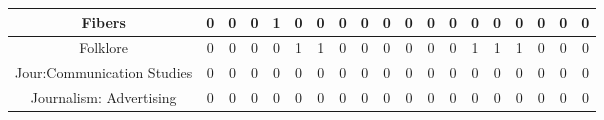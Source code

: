 \documentclass[10pt]{article}
\begin{document}
\begin{landscape}
\begin{longtable}[c]{|ccccccccccccccccccc|}
	\multicolumn{1}{|c|}{Fibers}                                     & \multicolumn{1}{c|}{0}          & \multicolumn{1}{c|}{0}          & \multicolumn{1}{c|}{0}          & \multicolumn{1}{c|}{1}          & \multicolumn{1}{c|}{0}          & \multicolumn{1}{c|}{0}          & \multicolumn{1}{c|}{0}          & \multicolumn{1}{c|}{0}          & \multicolumn{1}{c|}{0}          & \multicolumn{1}{c|}{0}          & \multicolumn{1}{c|}{0}          & \multicolumn{1}{c|}{0}          & \multicolumn{1}{c|}{0}          & \multicolumn{1}{c|}{0}          & \multicolumn{1}{c|}{0}          & \multicolumn{1}{c|}{0}          & \multicolumn{1}{c|}{0}          & 0          \\ \hline
	\multicolumn{1}{|c|}{Folklore}                                   & \multicolumn{1}{c|}{0}          & \multicolumn{1}{c|}{0}          & \multicolumn{1}{c|}{0}          & \multicolumn{1}{c|}{0}          & \multicolumn{1}{c|}{1}          & \multicolumn{1}{c|}{1}          & \multicolumn{1}{c|}{0}          & \multicolumn{1}{c|}{0}          & \multicolumn{1}{c|}{0}          & \multicolumn{1}{c|}{0}          & \multicolumn{1}{c|}{0}          & \multicolumn{1}{c|}{0}          & \multicolumn{1}{c|}{1}          & \multicolumn{1}{c|}{1}          & \multicolumn{1}{c|}{1}          & \multicolumn{1}{c|}{0}          & \multicolumn{1}{c|}{0}          & 0          \\ \hline
	\multicolumn{1}{|c|}{Jour:Communication Studies}                 & \multicolumn{1}{c|}{0}          & \multicolumn{1}{c|}{0}          & \multicolumn{1}{c|}{0}          & \multicolumn{1}{c|}{0}          & \multicolumn{1}{c|}{0}          & \multicolumn{1}{c|}{0}          & \multicolumn{1}{c|}{0}          & \multicolumn{1}{c|}{0}          & \multicolumn{1}{c|}{0}          & \multicolumn{1}{c|}{0}          & \multicolumn{1}{c|}{0}          & \multicolumn{1}{c|}{0}          & \multicolumn{1}{c|}{0}          & \multicolumn{1}{c|}{0}          & \multicolumn{1}{c|}{0}          & \multicolumn{1}{c|}{0}          & \multicolumn{1}{c|}{0}          & 0          \\ \hline
	\multicolumn{1}{|c|}{Journalism: Advertising}                    & \multicolumn{1}{c|}{0}          & \multicolumn{1}{c|}{0}          & \multicolumn{1}{c|}{0}          & \multicolumn{1}{c|}{0}          & \multicolumn{1}{c|}{0}          & \multicolumn{1}{c|}{0}          & \multicolumn{1}{c|}{0}          & \multicolumn{1}{c|}{0}          & \multicolumn{1}{c|}{0}          & \multicolumn{1}{c|}{0}          & \multicolumn{1}{c|}{0}          & \multicolumn{1}{c|}{0}          & \multicolumn{1}{c|}{0}          & \multicolumn{1}{c|}{0}          & \multicolumn{1}{c|}{0}          & \multicolumn{1}{c|}{0}          & \multicolumn{1}{c|}{0}          & 0          \\ \hline

\end{longtable}
\end{landscape}
\end{document}
